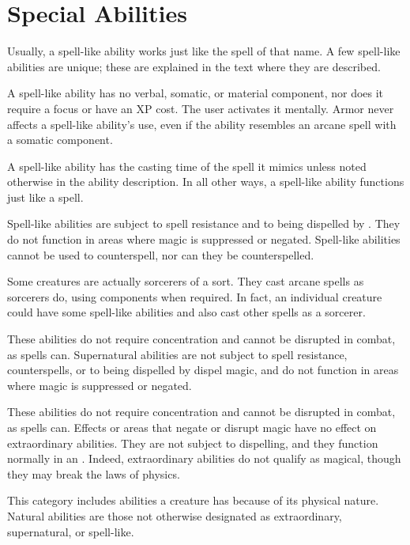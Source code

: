 \section{Special Abilities}

 Usually, a spell-like ability works just like the spell of that name. A few spell-like abilities are unique; these are explained in the text where they are described.

A spell-like ability has no verbal, somatic, or material component, nor does it require a focus or have an XP cost. The user activates it mentally. Armor never affects a spell-like ability's use, even if the ability resembles an arcane spell with a somatic component.

A spell-like ability has the casting time of the spell it mimics unless noted otherwise in the ability description. In all other ways, a spell-like ability functions just like a spell.

Spell-like abilities are subject to spell resistance and to being dispelled by . They do not function in areas where magic is suppressed or negated. Spell-like abilities cannot be used to counterspell, nor can they be counterspelled.

Some creatures are actually sorcerers of a sort. They cast arcane spells as sorcerers do, using components when required. In fact, an individual creature could have some spell-like abilities and also cast other spells as a sorcerer.

 These abilities do not require concentration and cannot be disrupted in combat, as spells can. Supernatural abilities are not subject to spell resistance, counterspells, or to being dispelled by dispel magic, and do not function in areas where magic is suppressed or negated.

 These abilities do not require concentration and cannot be disrupted in combat, as spells can. Effects or areas that negate or disrupt magic have no effect on extraordinary abilities. They are not subject to dispelling, and they function normally in an . Indeed, extraordinary abilities do not qualify as magical, though they may break the laws of physics.

 This category includes abilities a creature has because of its physical nature. Natural abilities are those not otherwise designated as extraordinary, supernatural, or spell-like.

